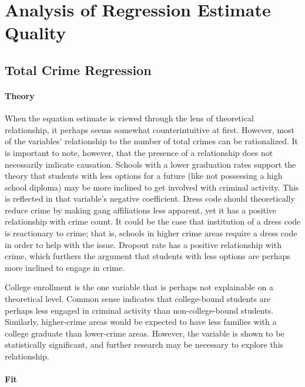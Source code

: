 \documentclass[12pt]{article}
\begin{document}
	\section{Analysis of Regression Estimate Quality}


	\subsection{Total Crime Regression}
	
	\paragraph{Theory}
	When the equation estimate is viewed through the lens of theoretical relationship, it perhaps seems somewhat counterintuitive at first.  However, most of the variables' relationship to the number of total crimes can be rationalized.  It is important to note, however, that the presence of a relationship does not necessarily indicate causation.  Schools with a lower graduation rates support the theory that students with less options for a future (like not possessing a high school diploma) may be more inclined to get involved with criminal activity.  This is reflected in that variable's negative coefficient.  Dress code should theoretically reduce crime by making gang affiliations less apparent, yet it has a positive relationship with crime count.  It could be the case that institution of a dress code is reactionary to crime; that is, schools in higher crime areas require a dress code in order to help with the issue.  Dropout rate has a positive relationship with crime, which furthers the argument that students with less options are perhaps more inclined to engage in crime.
	
	\par
	
	College enrollment is the one variable that is perhaps not explainable on a theoretical level.  Common sense indicates that college-bound students are perhaps less engaged in criminal activity than non-college-bound students.  Similarly, higher-crime areas would be expected to have less families with a college graduate than lower-crime areas.  However, the variable is shown to be statistically significant, and further research may be necessary to explore this relationship.
	
	\paragraph{Fit}
\end{document}
